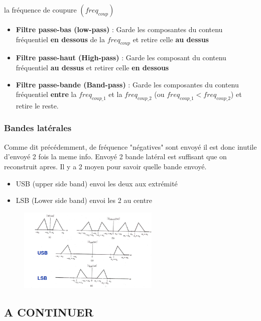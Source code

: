 \documentclass[12pt]{article}
\begin{document}
			la fréquence de coupure $(freq_{coup})$
			
			\begin{itemize}
				\item \textbf{Filtre passe-bas (low-pass)} : Garde les composantes du contenu fréquentiel \textbf{en dessous} de la $freq_{coup}$ et retire celle \textbf{au dessus}
				\item \textbf{Filtre passe-haut (High-pass)} : Garde les composant du contenu fréquentiel \textbf{au dessus} et retirer celle \textbf{en dessous}
				\item \textbf{Filtre passe-bande (Band-pass)} : Garde les composantes du contenu fréquentiel \textbf{entre} la $freq_{coup\_1}$ et la $freq_{coup\_2}$ (ou $freq_{coup\_1} < freq_{coup\_2}$) et retire le reste.
			\end{itemize}
		
		\subsubsection{Bandes latérales}
			Comme dit précédemment, de fréquence "négatives" sont envoyé il est donc inutile d'envoyé 2 fois la meme info. Envoyé 2 bande latéral est suffisant que on reconstruit apres. Il y a 2 moyen pour savoir quelle bande envoyé.
			\begin{itemize}
				\item USB (upper side band) envoi les deux aux extrémité
				\item LSB (Lower side band) envoi les 2 au centre
			\end{itemize}
			
						
			\begin{figure}[htp]
			\centering
			\includegraphics[width=0.6\textwidth]{img/BandeLateralUnique.png}
		\end{figure}
		
	\subsection{A CONTINUER}
	
\end{document}
